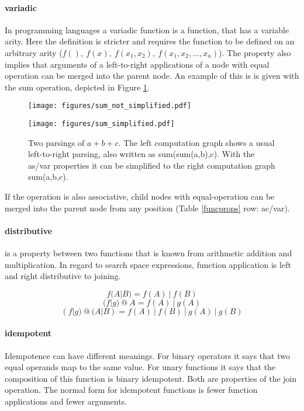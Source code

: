 \documentclass[english]{article}
\begin{document}
\paragraph{variadic}
In programming languages a variadic function is a function, that has a variable arity. Here the definition is stricter and requires the function to be defined on an arbitrary arity ($f(),\ f(x),\ f(x_1,x_2),\ f(x_1,x_2,...,x_n)$).  The property also implies that arguments of a left-to-right applications of a node with equal operation can be merged into the parent node. An example of this is is given with the sum operation, depicted in Figure \ref{as/var transform}.

\begin{figure}

\begin{minipage}[b]{0.35\textwidth}
\caption{Two parsings of $a+b+c$. The left computation graph shows a usual left-to-right parsing, also written as sum(sum(a,b),c). With the as/var properties it can be simplified to the right computation graph sum(a,b,c).}
\label{as/var transform}
\end{minipage}%
\hfill%
\begin{minipage}[b]{0.3\textwidth}
\centering
\texttt{[image: figures/sum\_not\_simplified.pdf]}

\end{minipage}%
\hfill%
\begin{minipage}[b]{0.3\textwidth}
\centering
\texttt{[image: figures/sum\_simplified.pdf]}
\end{minipage}%
\end{figure}

If the operation is also associative, child nodes with equal-operation can be merged into the parent node from any position (Table \ref{funcprops} row: ac/var).

\paragraph{distributive} is a property between two functions that is known from arithmetic addition and multiplication. In regard to search space expressions, function application is left and right distributive to joining.

$$f(A|B) = f(A)\ |\ f(B)$$
$$(f|g)\ @\ A = f(A)\ |\ g(A)$$
$$(f|g)\ @\ (A|B) = f(A)\ |\ f(B)\ |\ g(A)\ |\ g(B)$$

\paragraph{idempotent}
Idempotence can have different meanings. For binary operators it says that two equal operands map to the same value. For unary functions it says that the composition of this function is binary idempotent. Both are properties of the join operation. The normal form for idempotent functions is fewer function applications and fewer arguments.
\end{document}

